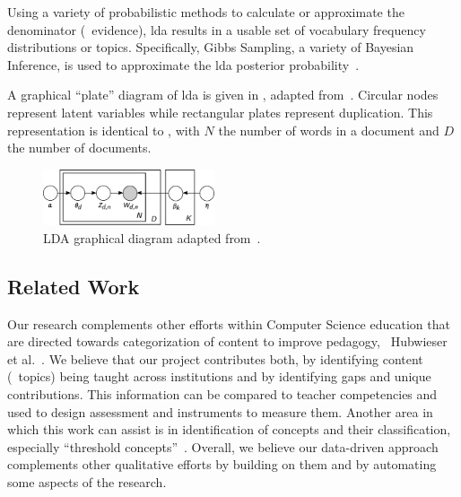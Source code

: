 
\noindent
Using a variety of probabilistic methods to calculate or approximate the denominator (\ie\ evidence), \ac{lda} results in a usable set of vocabulary frequency distributions or topics.
Specifically, Gibbs Sampling, a variety of Bayesian Inference, is used to approximate the \ac{lda} posterior probability~\cite{Blei2003}.


A graphical ``plate'' diagram of \ac{lda} is given in , adapted from~\cite{Blei2003}.
Circular nodes represent latent variables while rectangular plates represent duplication.
This representation is identical to , with $N$ the number of words in a document and $D$ the number of documents.


\begin{figure}
  \includegraphics[width=0.45\textwidth]{figures/lda-plates}
  \caption{LDA graphical diagram adapted from~\cite{Blei2012}\label{fig:lda-plates}.}
\end{figure}


\subsection{Related Work}
\label{sec:related-work}


Our research complements other efforts within Computer Science education that are directed towards categorization of content to improve pedagogy, \eg\ Hubwieser et al.~\cite{hubwieser2013}.
We believe that our project contributes both, by identifying content (\ie\ topics) being taught across institutions and by identifying gaps and unique contributions.
This information can be compared to teacher competencies and used to design assessment and instruments to measure them.
Another area in which this work can assist is in identification of concepts and their classification, especially ``threshold concepts''~\cite{ShinnersKennedyFincher2013}.
Overall, we believe our data-driven approach complements other qualitative efforts by building on them and by automating some aspects of the research.

